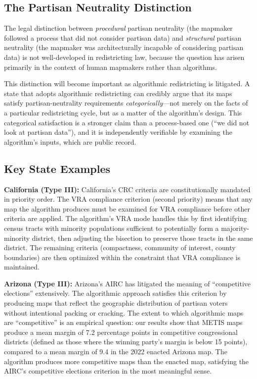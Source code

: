 \subsection{The Partisan Neutrality Distinction}

The legal distinction between \textit{procedural} partisan neutrality (the mapmaker followed a process that did not consider partisan data) and \textit{structural} partisan neutrality (the mapmaker was architecturally incapable of considering partisan data) is not well-developed in redistricting law, because the question has arisen primarily in the context of human mapmakers rather than algorithms.

This distinction will become important as algorithmic redistricting is litigated. A state that adopts algorithmic redistricting can credibly argue that its maps satisfy partisan-neutrality requirements \textit{categorically}---not merely on the facts of a particular redistricting cycle, but as a matter of the algorithm's design. This categorical satisfaction is a stronger claim than a process-based one (``we did not look at partisan data''), and it is independently verifiable by examining the algorithm's inputs, which are public record.

\subsection{Key State Examples}

\textbf{California (Type III):} California's CRC criteria are constitutionally mandated in priority order. The VRA compliance criterion (second priority) means that any map the algorithm produces must be examined for VRA compliance before other criteria are applied. The algorithm's VRA mode handles this by first identifying census tracts with minority populations sufficient to potentially form a majority-minority district, then adjusting the bisection to preserve those tracts in the same district. The remaining criteria (compactness, community of interest, county boundaries) are then optimized within the constraint that VRA compliance is maintained.

\textbf{Arizona (Type III):} Arizona's AIRC has litigated the meaning of ``competitive elections'' extensively. The algorithmic approach satisfies this criterion by producing maps that reflect the geographic distribution of partisan voters without intentional packing or cracking. The extent to which algorithmic maps are ``competitive'' is an empirical question: our results show that METIS maps produce a mean margin of 7.2 percentage points in competitive congressional districts (defined as those where the winning party's margin is below 15 points), compared to a mean margin of 9.4 in the 2022 enacted Arizona map. The algorithm produces more competitive maps than the enacted map, satisfying the AIRC's competitive elections criterion in the most meaningful sense.

